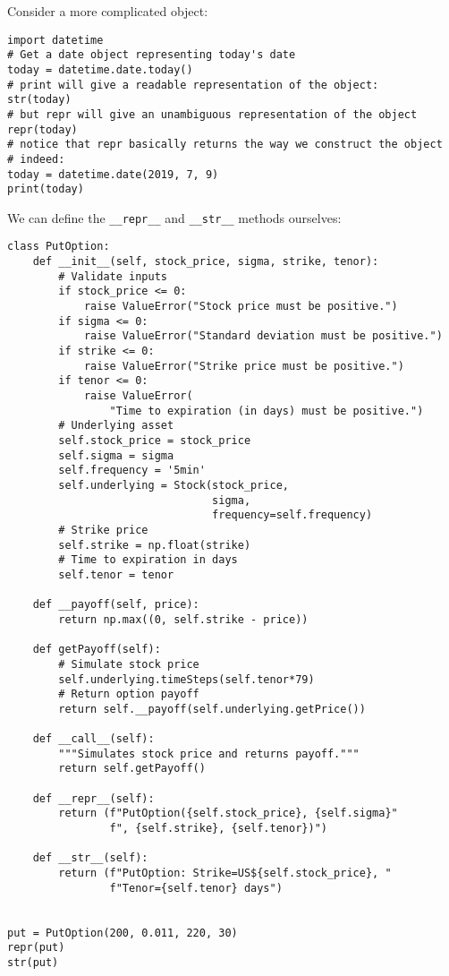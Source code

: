 \documentclass[12pt, a4paper]{article}
\begin{document}
Consider a more complicated object:
\lstset{language=jupyter-python,label= ,caption= ,captionpos=b,numbers=none}
\begin{lstlisting}
import datetime
# Get a date object representing today's date
today = datetime.date.today()
# print will give a readable representation of the object:
str(today)
# but repr will give an unambiguous representation of the object
repr(today)
# notice that repr basically returns the way we construct the object
# indeed:
today = datetime.date(2019, 7, 9)
print(today)
\end{lstlisting}

We can define the \texttt{\_\_repr\_\_} and \texttt{\_\_str\_\_} methods ourselves:
\lstset{language=jupyter-python,label= ,caption= ,captionpos=b,numbers=none}
\begin{lstlisting}
class PutOption:
    def __init__(self, stock_price, sigma, strike, tenor):
        # Validate inputs
        if stock_price <= 0:
            raise ValueError("Stock price must be positive.")
        if sigma <= 0:
            raise ValueError("Standard deviation must be positive.")
        if strike <= 0:
            raise ValueError("Strike price must be positive.")
        if tenor <= 0:
            raise ValueError(
                "Time to expiration (in days) must be positive.")
        # Underlying asset
        self.stock_price = stock_price
        self.sigma = sigma
        self.frequency = '5min'
        self.underlying = Stock(stock_price,
                                sigma,
                                frequency=self.frequency)
        # Strike price
        self.strike = np.float(strike)
        # Time to expiration in days
        self.tenor = tenor

    def __payoff(self, price):
        return np.max((0, self.strike - price))

    def getPayoff(self):
        # Simulate stock price
        self.underlying.timeSteps(self.tenor*79)
        # Return option payoff
        return self.__payoff(self.underlying.getPrice())

    def __call__(self):
        """Simulates stock price and returns payoff."""
        return self.getPayoff()

    def __repr__(self):
        return (f"PutOption({self.stock_price}, {self.sigma}"
                f", {self.strike}, {self.tenor})")

    def __str__(self):
        return (f"PutOption: Strike=US${self.stock_price}, "
                f"Tenor={self.tenor} days")


put = PutOption(200, 0.011, 220, 30)
repr(put)
str(put)
\end{lstlisting}
\end{document}
